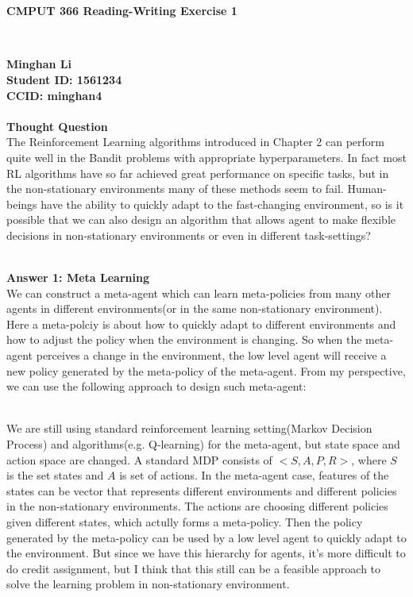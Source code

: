 \documentclass[12pt,a4paper]{article}
\begin{document}
\begin{center}
\begin{LARGE}
\ \\
\ \\

\bfseries{CMPUT 366 Reading-Writing Exercise 1}
\end{LARGE}
\ \\

\end{center}

\noindent \textbf{Minghan Li}\\
\textbf{Student ID: 1561234}\\
\textbf{CCID: minghan4}\\

\ \\
\noindent \textbf{Thought Question}
\ \\
The Reinforcement Learning algorithms introduced in Chapter 2 can perform quite well in the Bandit problems with appropriate hyperparameters. In fact most RL algorithms have so far achieved great performance on specific tasks, but in the non-stationary environments many of these methods seem to fail. Human-beings have the ability to quickly adapt to the fast-changing environment, so is it possible that we can also design an algorithm that allows agent to make flexible decisions in non-stationary environments or even in different task-settings? 


\ \\
\noindent \textbf{Answer 1: Meta Learning} 
\ \\
We can construct a meta-agent which can learn meta-policies from many other agents in different environments(or in the same non-stationary environment). Here a meta-polciy is about how to quickly adapt to different environments and how to adjust the policy when the environment is changing. So when the meta-agent perceives a change in the environment, the low level agent will receive a new policy generated by the meta-policy of the meta-agent. From my perspective, we can use the following approach to design such meta-agent:

\ \\
We are still using standard reinforcement learning setting(Markov Decision Process) and algorithms(e.g. Q-learning) for the meta-agent, but state space and action space are changed. A standard MDP consists of $<S, A, P, R>$, where $S$ is the set states and $A$ is set of actions. In the meta-agent case, features of the states can be vector that represents different environments and different policies in the non-stationary environments. The actions are choosing different policies given different states, which actully forms a meta-policy. Then the policy generated by the meta-policy can be used by a low level agent to quickly adapt to the environment. But since we have this hierarchy for agents, it's more difficult to do credit assignment, but I think that this still can be a feasible approach to solve the learning problem in non-stationary environment.
\end{document}
